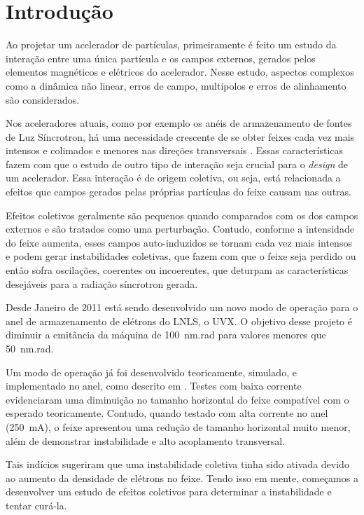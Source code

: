 \chapter{Introdução} 	\label{cap:intro}

Ao projetar um acelerador de partículas, primeiramente é feito um estudo da interação entre uma única partícula e os campos externos, gerados pelos elementos magnéticos e elétricos do acelerador. Nesse estudo, aspectos complexos como a dinâmica não linear, erros de campo, multipolos e erros de alinhamento são considerados.

Nos aceleradores atuais, como por exemplo os anéis de armazenamento de fontes de Luz Síncrotron, há uma necessidade crescente de se obter feixes cada vez mais intensos e colimados e menores nas direções transversais . Essas características fazem com que o estudo de outro tipo de interação seja crucial para o
\textit{design} de um acelerador. Essa interação é de origem coletiva, ou seja, está relacionada a efeitos que campos gerados pelas próprias partículas do feixe causam nas outras.

Efeitos coletivos geralmente são pequenos quando comparados com os dos campos externos e são tratados como uma perturbação. Contudo, conforme a intensidade do feixe aumenta, esses campos auto-induzidos se tornam cada vez mais intensos e podem gerar instabilidades coletivas, que fazem com que o feixe seja perdido
ou então sofra oscilações, coerentes ou incoerentes, que deturpam as características desejáveis para a radiação síncrotron gerada.

Desde Janeiro de 2011 está sendo desenvolvido um novo modo de operação para o anel de armazenamento de elétrons do LNLS, o UVX. O objetivo desse projeto é diminuir a emitância da máquina de 100~nm.rad para valores menores que 50~nm.rad.

Um modo de operação já foi desenvolvido teoricamente, simulado, e implementado no anel, como descrito em \cite{Fernando}. Testes com baixa corrente evidenciaram uma diminuição no tamanho horizontal do feixe compatível com o esperado teoricamente. Contudo, quando testado com alta corrente no anel (250~mA), o feixe apresentou uma redução de tamanho horizontal muito menor, além de demonstrar instabilidade e alto acoplamento transversal.

Tais indícios sugeriram que uma instabilidade coletiva tinha sido ativada devido ao aumento da densidade de elétrons no feixe. Tendo isso em mente, começamos a desenvolver um estudo de efeitos coletivos para determinar a instabilidade e tentar curá-la.

